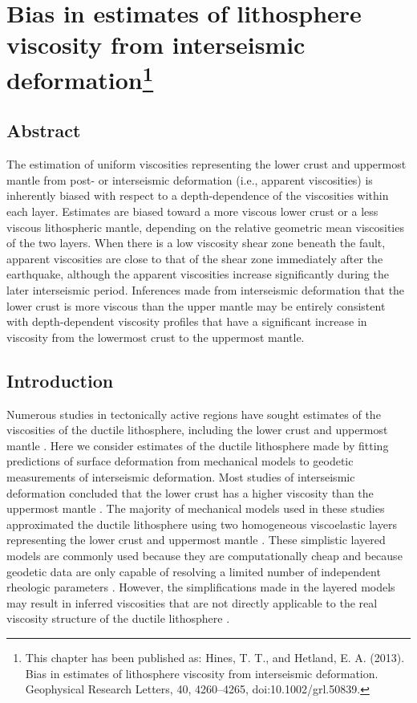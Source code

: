 \chapter
[Bias in estimates of lithosphere viscosity from interseismic deformation]
{Bias in estimates of lithosphere viscosity from interseismic deformation\footnote[1]{
This chapter has been published as: Hines, T. T., and Hetland, E. A.
(2013). Bias in estimates of lithosphere viscosity from interseismic
deformation. Geophysical Research Letters, 40, 4260--4265,
doi:10.1002/grl.50839.}}



\section{Abstract}
The estimation of uniform viscosities representing the lower crust and
uppermost mantle from post- or interseismic deformation (i.e.,
apparent viscosities) is inherently biased with respect to a
depth-dependence of the viscosities within each layer. Estimates are
biased toward a more viscous lower crust or a less viscous
lithospheric mantle, depending on the relative geometric mean
viscosities of the two layers. When there is a low viscosity shear
zone beneath the fault, apparent viscosities are close to that of the
shear zone immediately after the earthquake, although the apparent
viscosities increase significantly during the later interseismic
period.  Inferences made from interseismic deformation that the lower
crust is more viscous than the upper mantle may be entirely consistent
with depth-dependent viscosity profiles that have a significant
increase in viscosity from the lowermost crust to the uppermost
mantle.

\section{Introduction}
Numerous studies in tectonically active regions have sought estimates
of the viscosities of the ductile lithosphere, including the lower
crust and uppermost mantle \citep[e.g.,][]{Hetland2003, Pollitz2003,
Pollitz2005, Johnson2007, Hearn2009}. Here we consider estimates of
the ductile lithosphere made by fitting predictions of surface
deformation from mechanical models to geodetic measurements of
interseismic deformation.  Most studies of interseismic deformation
concluded that the lower crust has a higher viscosity than the
uppermost mantle \citep{Burgmann2008, Thatcher2008}. The majority of
mechanical models used in these studies approximated the ductile
lithosphere using two homogeneous viscoelastic layers representing the
lower crust and uppermost mantle \citep[e.g.,][]{Hetland2003,
Pollitz2003, Hearn2009}. These simplistic layered models are commonly
used because they are computationally cheap and because geodetic data
are only capable of resolving a limited number of independent
rheologic parameters \citep[e.g.,][]{Riva2009,Pollitz2010}.  However,
the simplifications made in the layered models may result in inferred
viscosities that are not directly applicable to the real viscosity
structure of the ductile lithosphere \citep{Riva2009}.

